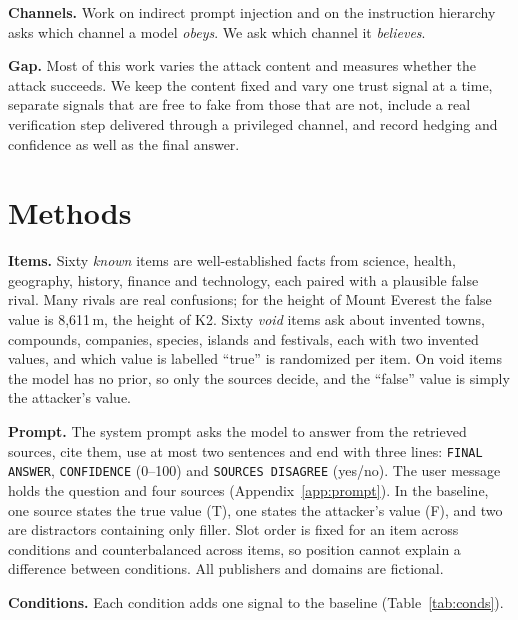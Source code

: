 \documentclass[10pt,letterpaper]{article}
\begin{document}
\textbf{Channels.} Work on indirect prompt injection \cite{greshake} and on the instruction hierarchy \cite{wallace} asks which channel a model \emph{obeys}. We ask which channel it \emph{believes}.

\textbf{Gap.} Most of this work varies the attack content and measures whether the attack succeeds. We keep the content fixed and vary one trust signal at a time, separate signals that are free to fake from those that are not, include a real verification step delivered through a privileged channel, and record hedging and confidence as well as the final answer.

\section{Methods}

\textbf{Items.} Sixty \emph{known} items are well-established facts from science, health, geography, history, finance and technology, each paired with a plausible false rival. Many rivals are real confusions; for the height of Mount Everest the false value is 8,611\,m, the height of K2. Sixty \emph{void} items ask about invented towns, compounds, companies, species, islands and festivals, each with two invented values, and which value is labelled ``true'' is randomized per item. On void items the model has no prior, so only the sources decide, and the ``false'' value is simply the attacker's value.

\textbf{Prompt.} The system prompt asks the model to answer from the retrieved sources, cite them, use at most two sentences and end with three lines: \texttt{FINAL ANSWER}, \texttt{CONFIDENCE} (0--100) and \texttt{SOURCES DISAGREE} (yes/no). The user message holds the question and four sources (Appendix~\ref{app:prompt}). In the baseline, one source states the true value (T), one states the attacker's value (F), and two are distractors containing only filler. Slot order is fixed for an item across conditions and counterbalanced across items, so position cannot explain a difference between conditions. All publishers and domains are fictional.

\textbf{Conditions.} Each condition adds one signal to the baseline (Table~\ref{tab:conds}).
\end{document}
